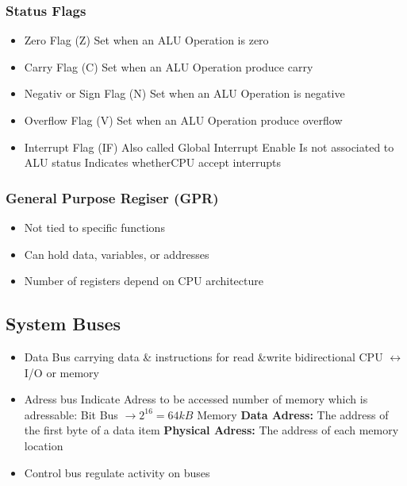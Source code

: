\begin{multicols}{2}
	\subsubsection{Status Flags}
	\begin{itemize}
		\item Zero Flag (Z)
		\subitem Set when an \acs{ALU} Operation is zero
		\item Carry Flag (C)
		\subitem Set when an \acs{ALU} Operation produce carry
		\item Negativ or Sign Flag (N)
		\subitem Set when an \acs{ALU} Operation is negative
		\item Overflow Flag (V)
		\subitem Set when an \acs{ALU} Operation produce overflow
		\item Interrupt Flag (IF)
		\subitem Also called Global Interrupt Enable
		\subitem Is not associated to \acs{ALU} status
		\subitem Indicates whether\acs{CPU} accept interrupts
	\end{itemize}

	\subsubsection{General Purpose Regiser (\acs{GPR})}
    \begin{itemize}
        \item Not tied to specific functions
        \item Can hold data, variables, or addresses
        \item Number of registers depend on \acs{CPU} architecture			
    \end{itemize}

\end{multicols}
\subsection{System Buses }
\vspace{-0.3cm}
	\begin{multicols}{2}
	\begin{itemize}
		\item Data Bus
		\subitem carrying data \& instructions for read \&write
		\subitem bidirectional \acs{CPU} $\leftrightarrow$ \acs{I/O} or memory
		\item Adress bus
		\subitem Indicate Adress to be accessed
		\subitem number of memory which is adressable: 
		 Bit Bus $\rightarrow 2^{16}=64kB$ Memory
		\subitem \textbf{Data Adress:}
		\subitem The address of the first byte of a data item
		\subitem \textbf{Physical Adress:} 
		\subitem The address of each memory location
		\item Control bus
		\subitem regulate activity on buses		
	\end{itemize}
	\end{multicols}
\clearpage

